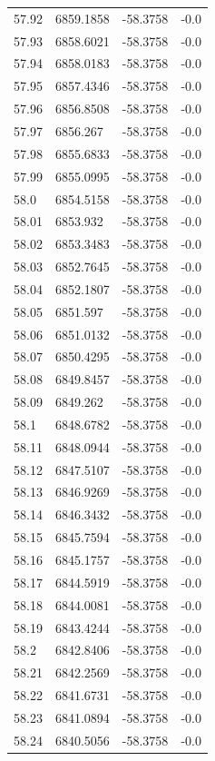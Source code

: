 \begin{table}[H]
\begin{tabular}{llll}
57.92 & 6859.1858 & -58.3758 & -0.0 \\
57.93 & 6858.6021 & -58.3758 & -0.0 \\
57.94 & 6858.0183 & -58.3758 & -0.0 \\
57.95 & 6857.4346 & -58.3758 & -0.0 \\
57.96 & 6856.8508 & -58.3758 & -0.0 \\
57.97 & 6856.267 & -58.3758 & -0.0 \\
57.98 & 6855.6833 & -58.3758 & -0.0 \\
57.99 & 6855.0995 & -58.3758 & -0.0 \\
58.0 & 6854.5158 & -58.3758 & -0.0 \\
58.01 & 6853.932 & -58.3758 & -0.0 \\
58.02 & 6853.3483 & -58.3758 & -0.0 \\
58.03 & 6852.7645 & -58.3758 & -0.0 \\
58.04 & 6852.1807 & -58.3758 & -0.0 \\
58.05 & 6851.597 & -58.3758 & -0.0 \\
58.06 & 6851.0132 & -58.3758 & -0.0 \\
58.07 & 6850.4295 & -58.3758 & -0.0 \\
58.08 & 6849.8457 & -58.3758 & -0.0 \\
58.09 & 6849.262 & -58.3758 & -0.0 \\
58.1 & 6848.6782 & -58.3758 & -0.0 \\
58.11 & 6848.0944 & -58.3758 & -0.0 \\
58.12 & 6847.5107 & -58.3758 & -0.0 \\
58.13 & 6846.9269 & -58.3758 & -0.0 \\
58.14 & 6846.3432 & -58.3758 & -0.0 \\
58.15 & 6845.7594 & -58.3758 & -0.0 \\
58.16 & 6845.1757 & -58.3758 & -0.0 \\
58.17 & 6844.5919 & -58.3758 & -0.0 \\
58.18 & 6844.0081 & -58.3758 & -0.0 \\
58.19 & 6843.4244 & -58.3758 & -0.0 \\
58.2 & 6842.8406 & -58.3758 & -0.0 \\
58.21 & 6842.2569 & -58.3758 & -0.0 \\
58.22 & 6841.6731 & -58.3758 & -0.0 \\
58.23 & 6841.0894 & -58.3758 & -0.0 \\
58.24 & 6840.5056 & -58.3758 & -0.0 \\

\end{tabular}
\end{table}
